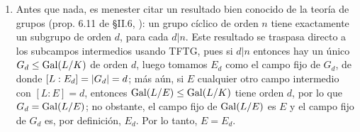 \begin{sol}\hphantom{r}
\begin{enumerate}[label=\alph*)]
\item 
Antes que nada, es menester citar un resultado bien conocido de la teoría de grupos (prop. 6.11 de \S II.6, \cite{aluffi}): un grupo cíclico de orden $n$ tiene exactamente un subgrupo de orden $d$, para cada $d|n$. Este resultado se traspasa directo a los subcampos intermedios usando TFTG, pues si $d|n$ entonces hay un único $G_d \leq \operatorname{Gal}(L/K)$ de orden $d$, luego tomamos $E_d$ como el campo fijo de $G_d$, de donde $[L:E_d] = \abs{G_d} = d$; más aún, si $E$ cualquier otro campo intermedio con $[L:E] = d$, entonces $\operatorname{Gal}(L/E) \leq \operatorname{Gal}(L/K)$ tiene orden $d$, por lo que $G_d = \operatorname{Gal}(L/E)$; no obstante, el campo fijo de $\operatorname{Gal}(L/E)$ es $E$ y el campo fijo de $G_d$ es, por definición, $E_d$. Por lo tanto, $E=E_d$.


\end{enumerate}
\end{sol}
